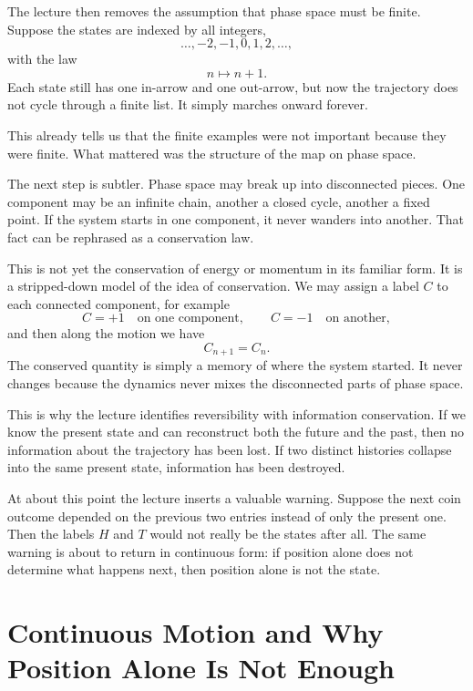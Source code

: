 The lecture then removes the assumption that phase space must be finite. Suppose the states are indexed by all integers,
\[
\ldots,-2,-1,0,1,2,\ldots,
\]
with the law
\begin{equation}
n\mapsto n+1.
\end{equation}
Each state still has one in-arrow and one out-arrow, but now the trajectory does not cycle through a finite list. It simply marches onward forever.

This already tells us that the finite examples were not important because they were finite. What mattered was the structure of the map on phase space.

The next step is subtler. Phase space may break up into disconnected pieces. One component may be an infinite chain, another a closed cycle, another a fixed point. If the system starts in one component, it never wanders into another. That fact can be rephrased as a conservation law.

This is not yet the conservation of energy or momentum in its familiar form. It is a stripped-down model of the idea of conservation. We may assign a label \(C\) to each connected component, for example
\begin{equation}
C=+1 \quad \text{on one component},\qquad C=-1 \quad \text{on another},
\end{equation}
and then along the motion we have
\begin{equation}
C_{n+1}=C_n.
\end{equation}
The conserved quantity is simply a memory of where the system started. It never changes because the dynamics never mixes the disconnected parts of phase space.

This is why the lecture identifies reversibility with information conservation. If we know the present state and can reconstruct both the future and the past, then no information about the trajectory has been lost. If two distinct histories collapse into the same present state, information has been destroyed.

At about this point the lecture inserts a valuable warning. Suppose the next coin outcome depended on the previous two entries instead of only the present one. Then the labels \(H\) and \(T\) would not really be the states after all. The same warning is about to return in continuous form: if position alone does not determine what happens next, then position alone is not the state.

\section{Continuous Motion and Why Position Alone Is Not Enough}

